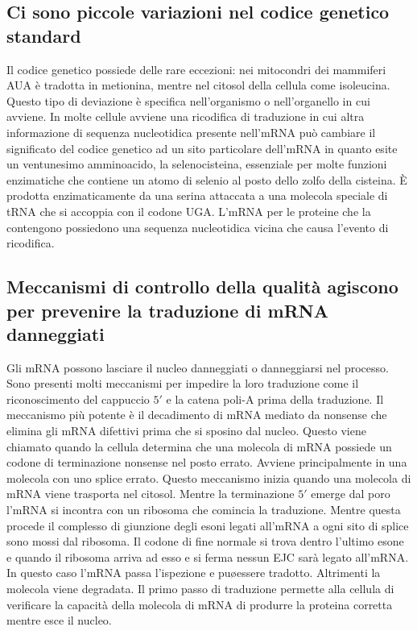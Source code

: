 \subsection{Ci sono piccole variazioni nel codice genetico standard}
Il codice genetico possiede delle rare eccezioni: nei mitocondri dei mammiferi AUA \`e tradotta in metionina, mentre nel citosol della cellula come isoleucina. Questo tipo di deviazione
\`e specifica nell'organismo o nell'organello in cui avviene. In molte cellule avviene una ricodifica di traduzione in cui altra informazione di sequenza nucleotidica presente 
nell'mRNA pu\`o cambiare il significato del codice genetico ad un sito particolare dell'mRNA in quanto esite un ventunesimo amminoacido, la selenocisteina, essenziale per molte funzioni
enzimatiche che contiene un atomo di selenio al posto dello zolfo della cisteina. \`E prodotta enzimaticamente da una serina attaccata a una molecola speciale di tRNA che si accoppia 
con il codone UGA. L'mRNA per le proteine che la contengono possiedono una sequenza nucleotidica vicina che causa l'evento di ricodifica. 
\subsection{Meccanismi di controllo della qualit\`a agiscono per prevenire la traduzione di mRNA danneggiati}
Gli mRNA possono lasciare il nucleo danneggiati o danneggiarsi nel processo. Sono presenti molti meccanismi per impedire la loro traduzione come il riconoscimento del cappuccio $5'$ e 
la catena poli-A prima della traduzione. Il meccanismo pi\`u potente \`e il decadimento di mRNA mediato da nonsense che elimina gli mRNA difettivi prima che si sposino dal nucleo. Questo
viene chiamato quando la cellula determina che una molecola di mRNA possiede un codone di terminazione nonsense nel posto errato. Avviene principalmente in una molecola con uno splice
errato. Questo meccanismo inizia quando una molecola di mRNA viene trasporta nel citosol. Mentre la terminazione $5'$ emerge dal poro l'mRNA si incontra con un ribosoma che comincia 
la traduzione. Mentre questa procede il complesso di giunzione degli esoni legati all'mRNA a ogni sito di splice sono mossi dal ribosoma. Il codone di fine normale si trova dentro 
l'ultimo esone e quando il ribosoma arriva ad esso e si ferma nessun EJC sar\`a legato all'mRNA. In questo caso l'mRNA passa l'ispezione e pu\o essere tradotto. Altrimenti la molecola
viene degradata. Il primo passo di traduzione permette alla cellula di verificare la capacit\` a della molecola di mRNA di produrre la proteina corretta mentre esce il nucleo. 
